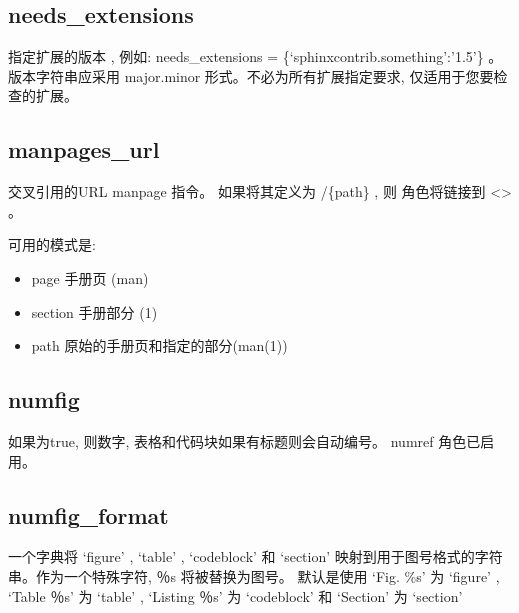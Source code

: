\documentclass[a4paper,10pt,english]{sphinxmanual}
\begin{document}
\subsection{needs\_extensions}
\label{\detokenize{sphinx_conf:needs-extensions}}
\sphinxAtStartPar
指定扩展的版本 , 例如: needs\_extensions = \{‘sphinxcontrib.something’:’1.5’\} 。
版本字符串应采用 major.minor 形式。不必为所有扩展指定要求, 仅适用于您要检查的扩展。


\subsection{manpages\_url}
\label{\detokenize{sphinx_conf:manpages-url}}
\sphinxAtStartPar
交叉引用的URL manpage 指令。
如果将其定义为 /\{path\} , 则  角色将链接到 <> 。

\sphinxAtStartPar
可用的模式是:
\begin{itemize}
\item {} 
\sphinxAtStartPar
page \sphinxhyphen{} 手册页 (man)

\item {} 
\sphinxAtStartPar
section \sphinxhyphen{} 手册部分 (1)

\item {} 
\sphinxAtStartPar
path \sphinxhyphen{} 原始的手册页和指定的部分(man(1))

\end{itemize}


\subsection{numfig}
\label{\detokenize{sphinx_conf:numfig}}
\sphinxAtStartPar
如果为true, 则数字, 表格和代码块如果有标题则会自动编号。 numref 角色已启用。


\subsection{numfig\_format}
\label{\detokenize{sphinx_conf:numfig-format}}
\sphinxAtStartPar
一个字典将 ‘figure’ , ‘table’ , ‘code\sphinxhyphen{}block’ 和 ‘section’ 映射到用于图号格式的字符串。作为一个特殊字符, ％s 将被替换为图号。
默认是使用 ‘Fig. \%s’ 为 ‘figure’ , ‘Table ％s’ 为 ‘table’ , ‘Listing ％s’ 为 ‘code\sphinxhyphen{}block’ 和 ‘Section’ 为 ‘section’
\end{document}
